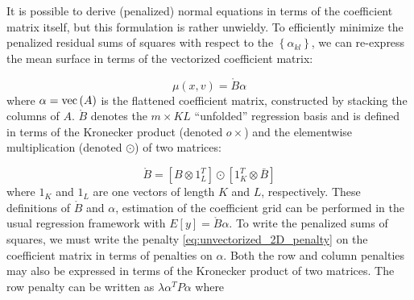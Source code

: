 \documentclass[12pt]{article}
\theoremstyle{definition}
\begin{document}

It is possible to derive (penalized) normal equations in terms of the coefficient matrix itself, but this formulation is rather unwieldy. To efficiently minimize the penalized residual sums of squares with respect to the $\left\{ \alpha_{kl} \right\}$, we can re-express the mean surface in terms of the vectorized coefficient matrix:

\begin{equation} \label{eq:vectorized_2D_TP_mean_surface}
\mu \left(x,v\right) = \mathring{B} \alpha
\end{equation}
\noindent
where $\alpha = \textup{vec}\left(A \right)$ is the flattened coefficient matrix, constructed by stacking the columns of $A$. $\mathring{B}$ denotes the $m \times KL$ ``unfolded'' regression basis and is defined in terms of the Kronecker product (denoted $o\times$) and the elementwise multiplication (denoted $\odot$) of two matrices:

\begin{equation*}
\mathring{B} = \left[B \otimes 1^T_L \right] \odot \left[1^T_K \otimes \bar{B} \right]
\end{equation*}
\noindent
where 
$1_K$ and $1_L$ are one vectors of length $K$ and $L$, respectively. These definitions of $\mathring{B}$ and $\alpha$, estimation of the coefficient grid can be performed in the usual regression framework with $E\left[ y\right] = \mathring{B}\alpha$. To write the penalized sums of squares, we must write the penalty \ref{eq:unvectorized_2D_penalty} on the coefficient matrix in terms of penalties on $\alpha$. Both the row and column penalties may also be expressed in terms of the Kronecker product of two matrices. The row penalty can be written as $\lambda \alpha^T P \alpha$ where
\end{document}
